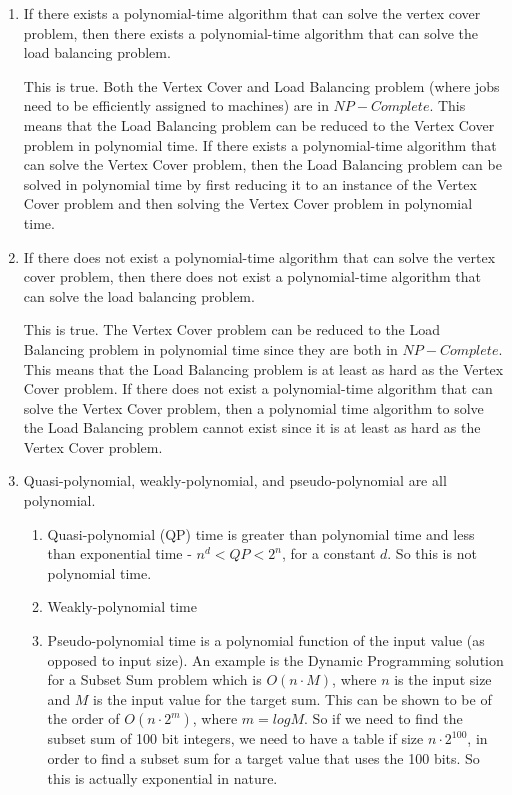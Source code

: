 \documentclass[paper=a4, fontsize=11pt]{scrartcl} %
\numberwithin{figure}{section} %
\numberwithin{table}{section} %
\begin{document}
\begin{enumerate}
\begin{enumerate}
\item If there exists a polynomial-time algorithm that can solve the vertex cover problem, then there exists a polynomial-time algorithm that can solve the load balancing problem.

This is true. Both the Vertex Cover and Load Balancing problem (where jobs need to be efficiently assigned to machines) are in $NP-Complete$. This means that the Load Balancing problem can be reduced to the Vertex Cover problem in polynomial time.  If there exists a polynomial-time algorithm that can solve the Vertex Cover problem, then the Load Balancing problem can be solved in polynomial time by first reducing it to an instance of the Vertex Cover problem and then solving the Vertex Cover problem in polynomial time.

\item If there does not exist a polynomial-time algorithm that can solve the vertex cover problem, then there does not exist a polynomial-time algorithm that can solve the load balancing problem.

This is true. The Vertex Cover problem can be reduced to the Load Balancing problem in polynomial time since they are both in $NP-Complete$. This means that the Load Balancing problem is at least as hard as the Vertex Cover problem. If there does not exist a polynomial-time algorithm that can solve the Vertex Cover problem, then a polynomial time algorithm to solve the Load Balancing problem cannot exist since it is at least as hard as the Vertex Cover problem.

\item Quasi-polynomial, weakly-polynomial, and pseudo-polynomial are all polynomial.

\begin{enumerate}

\item Quasi-polynomial (QP) time is greater than polynomial time and less than exponential time - $n^d < QP < 2^n$, for a constant $d$. So this is not polynomial time.

\item Weakly-polynomial time

\item Pseudo-polynomial time is a polynomial function of the input value (as opposed to input size). An example is the Dynamic Programming solution for a Subset Sum problem which is $O(n \cdot M)$, where $n$ is the input size and $M$ is the input value for the target sum. This can be shown to be of the order of $O(n \cdot 2^m)$, where $m=log M$. So if we need to find the subset sum of 100 bit integers, we need to have a table if size $n \cdot 2^{100}$, in order to find a subset sum for a target value that uses the 100 bits. So this is actually exponential in nature.


\end{enumerate}
\end{enumerate}
\end{enumerate}
\end{document}
